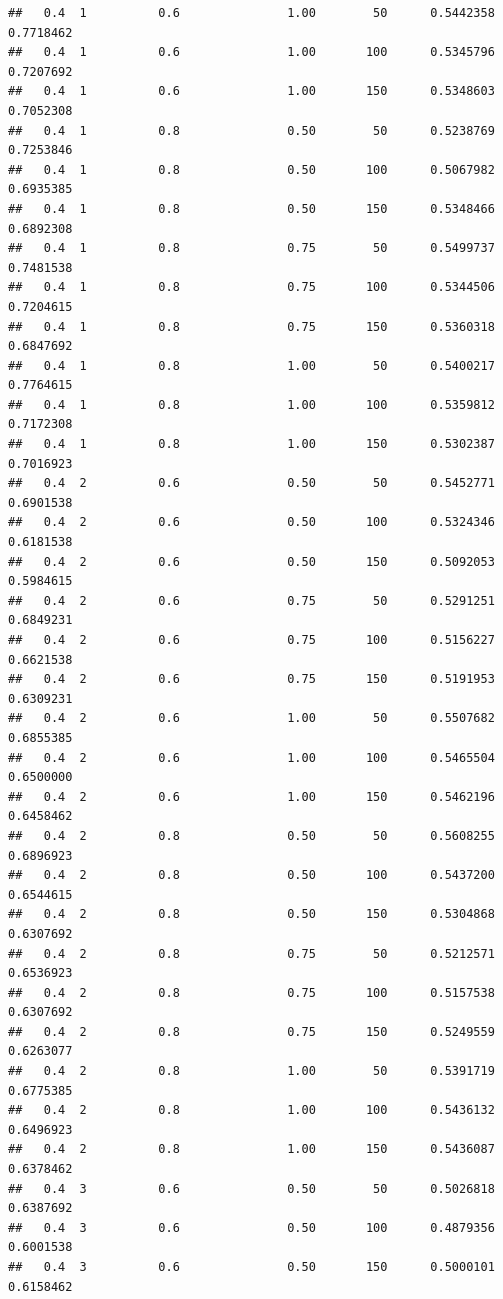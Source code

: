 \documentclass[
  11pt,
]{article}
\begin{document}
\begin{verbatim}
##   0.4  1          0.6               1.00        50      0.5442358  0.7718462
##   0.4  1          0.6               1.00       100      0.5345796  0.7207692
##   0.4  1          0.6               1.00       150      0.5348603  0.7052308
##   0.4  1          0.8               0.50        50      0.5238769  0.7253846
##   0.4  1          0.8               0.50       100      0.5067982  0.6935385
##   0.4  1          0.8               0.50       150      0.5348466  0.6892308
##   0.4  1          0.8               0.75        50      0.5499737  0.7481538
##   0.4  1          0.8               0.75       100      0.5344506  0.7204615
##   0.4  1          0.8               0.75       150      0.5360318  0.6847692
##   0.4  1          0.8               1.00        50      0.5400217  0.7764615
##   0.4  1          0.8               1.00       100      0.5359812  0.7172308
##   0.4  1          0.8               1.00       150      0.5302387  0.7016923
##   0.4  2          0.6               0.50        50      0.5452771  0.6901538
##   0.4  2          0.6               0.50       100      0.5324346  0.6181538
##   0.4  2          0.6               0.50       150      0.5092053  0.5984615
##   0.4  2          0.6               0.75        50      0.5291251  0.6849231
##   0.4  2          0.6               0.75       100      0.5156227  0.6621538
##   0.4  2          0.6               0.75       150      0.5191953  0.6309231
##   0.4  2          0.6               1.00        50      0.5507682  0.6855385
##   0.4  2          0.6               1.00       100      0.5465504  0.6500000
##   0.4  2          0.6               1.00       150      0.5462196  0.6458462
##   0.4  2          0.8               0.50        50      0.5608255  0.6896923
##   0.4  2          0.8               0.50       100      0.5437200  0.6544615
##   0.4  2          0.8               0.50       150      0.5304868  0.6307692
##   0.4  2          0.8               0.75        50      0.5212571  0.6536923
##   0.4  2          0.8               0.75       100      0.5157538  0.6307692
##   0.4  2          0.8               0.75       150      0.5249559  0.6263077
##   0.4  2          0.8               1.00        50      0.5391719  0.6775385
##   0.4  2          0.8               1.00       100      0.5436132  0.6496923
##   0.4  2          0.8               1.00       150      0.5436087  0.6378462
##   0.4  3          0.6               0.50        50      0.5026818  0.6387692
##   0.4  3          0.6               0.50       100      0.4879356  0.6001538
##   0.4  3          0.6               0.50       150      0.5000101  0.6158462

\end{verbatim}
\end{document}
